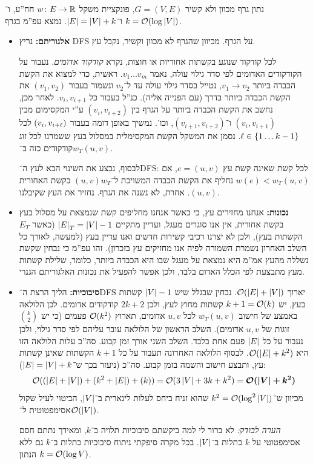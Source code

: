 \documentclass[]{../../../../tex/classes/homework}
\begin{document}
\npage%
	
\section{}%
	
	נתון גרף מכוון ולא קשיר $G = (V, E)$, פונקציית משקל $w \colon E \to \mathbb{R}$ חח''ע, ו־$k = \mathcal{O}(\log \left \lvert V \right \rvert)$ ו־$\left \lvert E \right \rvert = \left \lvert V \right \rvert + k$. נמצא עפ''מ בגרף. 
	\begin{itemize}
		\item \textbf{אלגוריתם: }נריץ DFS על הגרף. מכיוון שהגרף לא מכוון וקשיר, נקבל עץ. 
		
		לכל קודקוד שנוגע בקשתות אחוריות או חוצות, נקרא \textit{קודקוד אדומים}. 
		נעבור על הקודקודים האדומים לפי סדר גילוי עולה, נאמר $v_1 \dots v_m$. ראשית, כדי למצוא את הקשת הכבדה ביותר $v_1 \to v_2$, נטייל בסדר גילוי עולה עד ל־$v_2$ ונשמור בעבור $(v_1, v_2)$ את הקשת הכבדה ביותר בדרך (עם הפנייה אליה). כנ''ל בעבור כל $v_{i}, v_{i + 1}$. לאחר מכן, נחשב את הקשת הכבדה ביותר על הגרף בין $(v_i, v_{i + 2})$ ע''י המקסימום מבין $(v_{i}, v_{i +1})$ ו־$(v_{i + 1}, v_{i + 2})$, וכו'. נמשיך באופן דומה בעבור $(v_i, v_{i + \ell})$ לכל $\ell \in \{1 \dots k - 1\}$. נסמן את המשקל הקשת המקסימלית במסלול בעץ ששמרנו לכל זוג קודקודים כזה ב־$w_T(u, v)$. 
		
		לבסוף, נבצע את השינוי הבא לעץ ה־DFS: לכל קשת שאינה קשת עץ $e = (u, v)$, אם $w(e) < w_T(u, v)$ נחליף את הקשת הכבדה המשויכת ל־$(u, v)w_T$ בקשת האחורית $(u, v)$. אחרת, לא נשנה את הגרף. נחזיר את העץ שקיבלנו. 
		\item \textbf{נכונות: }אנחנו מחזירים עץ, כי כאשר אנחנו מחליפים קשת שנמצאת על מסלול בעץ בקשת אחורית, אין אנו סוגרים מעגל, ועדיין מתקיים $\left \lvert E \right \rvert_T = \left \lvert V \right \rvert - 1$ (כאשר $E_T$ הקשתות בעץ), ולכן לא יצרנו רכיבי קשירות חדשים ואנו עדיין בעץ (למעשה, לאורך כל השלב האחרון נשמרת השמורה לפיה אנו מחזיקים עץ בזכרון). זהו עפ''מ כי נבחין שקשת נשללה מהעץ אמ''מ היא נמצאת על מעגל שבו היא הכבדה ביותר, כלומר, שלילת קשתות מעץ מתבצעת לפי הכלל האדום בלבד, ולכן אפשר להפעיל את נכונות האלגוריתם הגנרי. 
		\item \textbf{סיבוכיות: }הליך הרצת ה־DFS יארוך $\mathcal{O}(\left \lvert E \right \rvert + \left \lvert V \right \rvert)$. 
		נבחין שבגלל שיש $\left \lvert V \right \rvert - 1$ קשתות בעץ, יש $k + 1 = \mathcal{O}(k)$ קשתות מחוץ לעץ, ולכן $2k + 2$ קודקודים אדומים. לכן 	הלולאה באמצע של חישוב $w_T(u, v)$ לכל $u, v$ אדומים, תארוץ $\mathcal{O}(k^{2})$ פעמים (כי יש $\binom{k}{2}$ זוגות של $u, v$ אדומים). השלב הראשון של הלולאה עובר עליהם לפי סדר גילוי, ולכן נעבור על כל $\left \lvert E \right \rvert$ פעם אחת בלבד. השלב השני אורך זמן קבוע. סה''כ עלות הלולאה הזו היא $\mathcal{O}(\left \lvert E \right \rvert + k^{2})$. לבסוף הלולאה האחרונה תעבור על כל $k + 1$ הקשתות שאינן קשתות עץ, ותבצע חישוב והשמה בזמן קבוע. סה''כ (ניעזר בכך ש־$\left \lvert E \right \rvert = \left \lvert V \right \rvert + k$): 
		\[ \mathcal{O}((\left \lvert E \right \rvert + \left \lvert V \right \rvert) + (k^{2} + \left \lvert E \right \rvert) + (k)) = \mathcal{O}(3\left \lvert V \right \rvert + 3k + k^{2}) = \bm{\mathcal{O}(\left \lvert V \right \rvert + k^{2})} \]
		מכיוון ש־$k^{2} = \mathcal{O}(\log^{2}\left \lvert V \right \rvert)$ שהוא זניח ביחס לעלות לינארית ב־$\left \lvert V \right \rvert$, הביטוי לעיל שקול אסימפטוטית ל־$\mathcal{O}(\left \lvert V \right \rvert)$. 
		
		\textit{הערה לבודק: }לא ברור לי למה ביקשתם סיבוכיות תלויה ב־$k$, ומאידך נתתם חסם אסימפטוטי על $k$ כתלות ב־$\left \lvert V \right \rvert$. בכל מקרה סיפקתי ניתוח סיבוכיות כתלות ב־$k$ גם ללא הנתון $k = \mathcal{O}(\log V)$. 
	\end{itemize}
	
\end{document}
